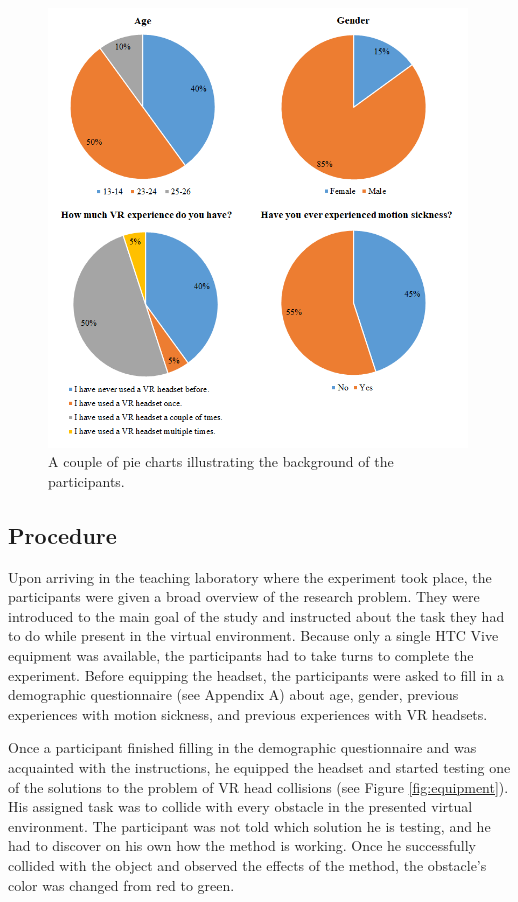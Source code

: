 \begin{figure}[th]
\centering
\includegraphics[width=0.99\textwidth]{img/demographic_charts.png}
\caption{A couple of pie charts illustrating the background of the participants.}
\label{fig:demographic_charts}
\end{figure}

\subsection{Procedure}

Upon arriving in the teaching laboratory where the experiment took place, the participants were given a broad overview of the research problem. They were introduced to the main goal of the study and instructed about the task they had to do while present in the virtual environment. Because only a single HTC Vive equipment was available, the participants had to take turns to complete the experiment. Before equipping the headset, the participants were asked to fill in a demographic questionnaire (see Appendix A) about age, gender, previous experiences with motion sickness, and previous experiences with VR headsets.

Once a participant finished filling in the demographic questionnaire and was acquainted with the instructions, he equipped the headset and started testing one of the solutions to the problem of VR head collisions (see Figure \ref{fig:equipment}). His assigned task was to collide with every obstacle in the presented virtual environment. The participant was not told which solution he is testing, and he had to discover on his own how the method is working. Once he successfully collided with the object and observed the effects of the method, the obstacle's color was changed from red to green. 

